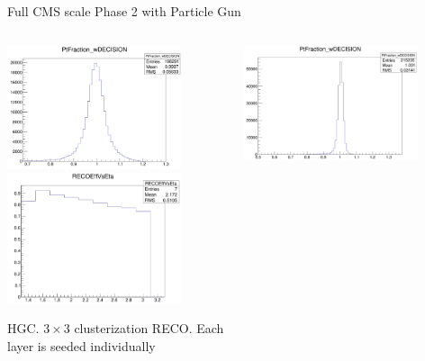 \documentclass[pdf, 9pt]{beamer}
\begin{document}
  \begin{frame}{Full CMS scale Phase 2 with Particle Gun}
    \begin{columns}[T]
      \begin{column}{0.5\textwidth}
        \includegraphics[width=0.8\textwidth, height=0.4\textheight]{figs/hgcal_fullscale/PtFraction_wDEC.png}\\
        \includegraphics[width=0.8\textwidth, height=0.4\textheight]{figs/hgcal_fullscale/RECO_EffVsEta.png}\\ \vspace{0.05cm}
        \begin{small}HGC. $3 \times 3$ clusterization RECO. Each layer is seeded individually\end{small}
      \end{column}
      \begin{column}{0.5\textwidth}
        \includegraphics[width=0.8\textwidth, height=0.4\textheight]{figs/shashlik_fullscale/PtFraction.png}\\

\end{column}
\end{columns}
\end{frame}
\end{document}
